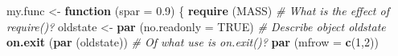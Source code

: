 \documentclass[
]{book}
\newenvironment{Shaded}{\begin{snugshade}}{\end{snugshade}}
\newcommand{\AttributeTok}[1]{\textcolor[rgb]{0.13,0.29,0.53}{#1}}
\newcommand{\CommentTok}[1]{\textcolor[rgb]{0.56,0.35,0.01}{\textit{#1}}}
\newcommand{\ConstantTok}[1]{\textcolor[rgb]{0.56,0.35,0.01}{#1}}
\newcommand{\ControlFlowTok}[1]{\textcolor[rgb]{0.13,0.29,0.53}{\textbf{#1}}}
\newcommand{\DecValTok}[1]{\textcolor[rgb]{0.00,0.00,0.81}{#1}}
\newcommand{\FloatTok}[1]{\textcolor[rgb]{0.00,0.00,0.81}{#1}}
\newcommand{\FunctionTok}[1]{\textcolor[rgb]{0.13,0.29,0.53}{\textbf{#1}}}
\newcommand{\NormalTok}[1]{#1}
\newcommand{\OtherTok}[1]{\textcolor[rgb]{0.56,0.35,0.01}{#1}}
\begin{document}
\begin{Shaded}
\begin{Highlighting}[]
\NormalTok{my.func }\OtherTok{\textless{}{-}} \ControlFlowTok{function}\NormalTok{ (}\AttributeTok{spar =} \FloatTok{0.9}\NormalTok{)}
\NormalTok{\{ }\FunctionTok{require}\NormalTok{ (MASS)                             }\CommentTok{\# What is the effect of require()?}
\NormalTok{  oldstate }\OtherTok{\textless{}{-}} \FunctionTok{par}\NormalTok{ (}\AttributeTok{no.readonly =} \ConstantTok{TRUE}\NormalTok{)       }\CommentTok{\# Describe object \textquotesingle{}oldstate\textquotesingle{}}
  \FunctionTok{on.exit}\NormalTok{ (}\FunctionTok{par}\NormalTok{ (oldstate))                   }\CommentTok{\# Of what use is on.exit()?}
  \FunctionTok{par}\NormalTok{ (}\AttributeTok{mfrow =} \FunctionTok{c}\NormalTok{(}\DecValTok{1}\NormalTok{,}\DecValTok{2}\NormalTok{))}
  

\end{Highlighting}
\end{Shaded}
\end{document}
